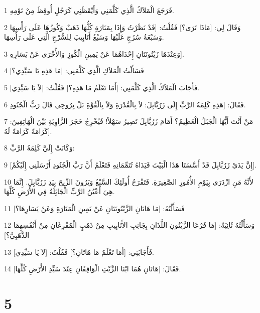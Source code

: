 \par 1 فَرَجَعَ الْمَلاَكُ الَّذِي كَلَّمَنِي وَأَيْقَظَنِي كَرَجُلٍ أُوقِظَ مِنْ نَوْمِهِ.
\par 2 وَقَالَ لِي: [مَاذَا تَرَى؟] فَقُلْتُ: [قَدْ نَظَرْتُ وَإِذَا بِمَنَارَةٍ كُلُّهَا ذَهَبٌ وَكُوزُهَا عَلَى رَأْسِهَا وَسَبْعَةُ سُرُجٍ عَلَيْهَا وَسَبْعُ أَنَابِيبَ لِلسُّرْجِ الَّتِي عَلَى رَأْسِهَا.
\par 3 وَعِنْدَهَا زَيْتُونَتَانِ إِحْدَاهُمَا عَنْ يَمِينِ الْكُوزِ وَالأُخْرَى عَنْ يَسَارِهِ].
\par 4 فَسَأَلْتُ الْمَلاَكِ الَّذِي كَلَّمَنِي: [مَا هَذِهِ يَا سَيِّدِي؟]
\par 5 فَأَجَابَ الْمَلاَكُ الَّذِي كَلَّمَنِي: [أَمَا تَعْلَمُ مَا هَذِهِ؟] فَقُلْتُ: [لاَ يَا سَيِّدِي].
\par 6 فَقَالَ: [هَذِهِ كَلِمَةُ الرَّبِّ إِلَى زَرُبَّابِلَ: لاَ بِالْقُدْرَةِ وَلاَ بِالْقُوَّةِ بَلْ بِرُوحِي قَالَ رَبُّ الْجُنُودِ.
\par 7 مَنْ أَنْتَ أَيُّهَا الْجَبَلُ الْعَظِيمُ؟ أَمَامَ زَرُبَّابِلَ تَصِيرُ سَهْلاً! فَيُخْرِجُ حَجَرَ الزَّاوِيَةِ بَيْنَ الْهَاتِفِينَ: كَرَامَةً كَرَامَةً لَهُ].
\par 8 وَكَانَتْ إِلَيَّ كَلِمَةُ الرَّبِّ:
\par 9 [إِنَّ يَدَيْ زَرُبَّابِلَ قَدْ أَسَّسَتَا هَذَا الْبَيْتَ فَيَدَاهُ تُتَمِّمَانِهِ فَتَعْلَمُ أَنَّ رَبَّ الْجُنُودِ أَرْسَلَنِي إِلَيْكُمْ].
\par 10 لأَنَّهُ مَنِ ازْدَرَى بِيَوْمِ الأُمُورِ الصَّغِيرَةِ. فَتَفْرَحُ أُولَئِكَ السَّبْعُ وَيَرُونَ الزِّيجَ بِيَدِ زَرُبَّابِلَ. إِنَّمَا هِيَ أَعْيُنُ الرَّبِّ الْجَائِلَةُ فِي الأَرْضِ كُلِّهَا.
\par 11 فَسَأَلْتُهُ: [مَا هَاتَانِ الزَّيْتُونَتَانِ عَنْ يَمِينِ الْمَنَارَةِ وَعَنْ يَسَارِهَا؟]
\par 12 وَسَأَلْتُهُ ثَانِيَةً: [مَا فَرْعَا الزَّيْتُونِ اللَّذَانِ بِجَانِبِ الأَنَابِيبِ مِنْ ذَهَبٍ الْمُفْرِغَانِ مِنْ أَنْفُسِهِمَا الذَّهَبِيَّ؟]
\par 13 فَأَجَابَنِي: [أَمَا تَعْلَمُ مَا هَاتَانِ؟] فَقُلْتُ: [لاَ يَا سَيِّدِي].
\par 14 فَقَالَ: [هَاتَانِ هُمَا ابْنَا الزَّيْتِ الْوَاقِفَانِ عِنْدَ سَيِّدِ الأَرْضِ كُلِّهَا].

\chapter{5}

